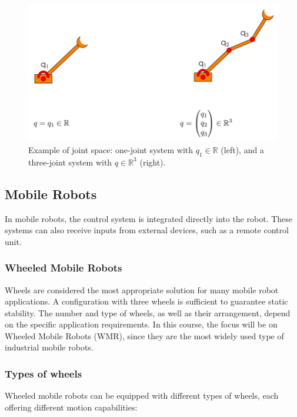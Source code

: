 \begin{figure}[H]
  \centering
  \includegraphics[width=0.9\linewidth]{imgs/joint_space_example.png}
  \caption{Example of joint space: one-joint system with $q_1 \in \mathbb{R}$ (left), and a three-joint system with $q \in \mathbb{R}^3$ (right).}
\end{figure}

\hfill

\subsection{Mobile Robots}

In mobile robots, the control system is integrated directly into the robot. These systems can also receive inputs from external devices, such as a remote control unit.

\subsubsection*{Wheeled Mobile Robots}

Wheels are considered the most appropriate solution for many mobile robot applications. A configuration with three wheels is sufficient to guarantee static stability. The number and type of wheels, as well as their arrangement, depend on the specific application requirements. In this course, the focus will be on Wheeled Mobile Robots (WMR), since they are the most widely used type of industrial mobile robots.

\subsubsection*{Types of wheels}

Wheeled mobile robots can be equipped with different types of wheels, each offering different motion capabilities:

